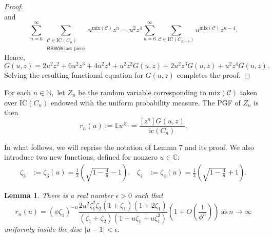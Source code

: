 \documentclass[11pt, reqno]{amsart}
\newtheorem{lemma}[theorem]{Lemma}
\theoremstyle{definition}
\def\C{{\mathbb C}}
\begin{document}
\begin{proof}
\begin{equation}
\end{equation}
and
\begin{equation}
    \sum_{n = 6}^{\infty}\sum_{\substack{\mathcal{C} \in \text{IC}(C_n) \\ \textsf{BBWW}\ \text{last piece}}} u^{\text{mix}(\mathcal{C})}z^n = u^2z^4\sum_{n = 6}^{\infty}\sum_{\mathcal{C} \in \text{IC}(C_{n-4})} u^{\text{mix}(\mathcal{C})}z^{n-4}.
\end{equation}
Hence,
\begin{equation}
G(u,z) = 2u^2z^2 + 6u^2z^3 + 4u^2z^4 + u^2z^2G(u,z)+2u^2z^3G(u,z)+u^2z^4G(u,z).
\end{equation}
Solving the resulting functional equation for $G(u,z)$ completes the proof.
\end{proof}

For each $n \in \mathbb{N},$ let $Z_n$ be the random variable corresponding to $\text{mix}(\mathcal{C})$ taken over $\text{IC}(C_n)$ endowed with the uniform probability measure. The PGF of $Z_n$ is then
\begin{equation}
r_n(u) := \mathbb{E}u^{Z_n} = \frac{[z^n]G(u,z)}{\text{ic}(C_n)}.
\end{equation}

In what follows, we will reprise the notation of Lemma 7 and its proof. We also introduce two new functions, defined for nonzero $u \in \C:$
\begin{align*}
\zeta_3 &:= \zeta_3(u) = \frac{1}{2}\left(\sqrt{1-\frac{4}{u}} - 1\right), &\zeta_4 &:= \zeta_4(u) = \frac{1}{2}\left(\sqrt{1-\frac{4}{u}} + 1\right).
\end{align*}

\begin{lemma}
There is a real number $\epsilon > 0$ such that
\[r_n(u) = (\phi\zeta_1)^{-n}\frac{2u^2\zeta_1^2\zeta_2(1+\zeta_1)(1+2\zeta_1)}{(\zeta_1+\zeta_2)(1+u\zeta_1+u\zeta_1^2)}\left(1+O\left(\frac{1}{\phi^n}\right)\right)\ \text{as}\ n \to \infty\]
uniformly inside the disc $|u-1|<\epsilon.$
\end{lemma}
\end{document}

